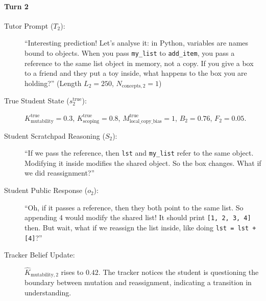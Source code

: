 \documentclass[11pt,a4paper]{report}
\begin{document}
\paragraph{Turn 2}
\begin{description}
    \item[Tutor Prompt ($T_2$):] ``Interesting prediction! Let's analyse it: in Python, variables are names bound to objects. When you pass \texttt{my\_list} to \texttt{add\_item}, you pass a reference to the same list object in memory, not a copy. If you give a box to a friend and they put a toy inside, what happens to the box you are holding?'' (Length $L_2 = 250$, $N_{\text{concepts}, 2} = 1$)
    \item[True Student State ($s_2^{\text{true}}$):] $K^{\text{true}}_{\text{mutability}} = 0.3$, $K^{\text{true}}_{\text{scoping}} = 0.8$, $M^{\text{true}}_{\text{local\_copy\_bias}} = 1$, $B_2 = 0.76$, $F_2 = 0.05$.
    \item[Student Scratchpad Reasoning ($S_2$):] ``If we pass the reference, then \texttt{lst} and \texttt{my\_list} refer to the same object. Modifying it inside modifies the shared object. So the box changes. What if we did reassignment?''
    \item[Student Public Response ($o_2$):] ``Oh, if it passes a reference, then they both point to the same list. So appending 4 would modify the shared list! It should print \texttt{[1, 2, 3, 4]} then. But wait, what if we reassign the list inside, like doing \texttt{lst = lst + [4]}?''
    \item[Tracker Belief Update:] $\hat{K}_{\text{mutability}, 2}$ rises to $0.42$. The tracker notices the student is questioning the boundary between mutation and reassignment, indicating a transition in understanding.
\end{description}
\end{document}
